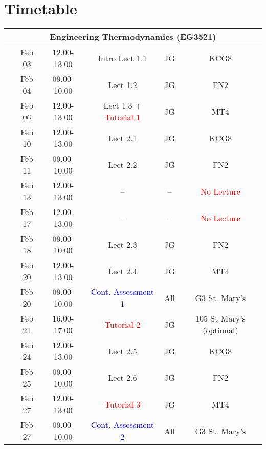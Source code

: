 \documentclass[11pt,oneside,a4paper]{article}
\begin{document}
\section{Timetable}


\begin{center}
\begin{tabular}{||c||c|c|c|c|c||}
\hline\hline
\multicolumn{6}{||c||}{Engineering Thermodynamics (EG3521)} \\
\hline\hline
\multirow{3}{*}{\color{red}{Week 30}} & Feb 03   & 12.00-13.00 & Intro Lect 1.1 & JG  & KCG8 \\
                                      & Feb 04   & 09.00-10.00 & Lect 1.2  & JG  & FN2  \\
                                      & Feb 06   & 12.00-13.00 & Lect 1.3 + \textcolor{red}{Tutorial 1} & JG  & MT4  \\
\hline
\multirow{3}{*}{\color{red}{Week 31}} & Feb 10   & 12.00-13.00 & Lect  2.1  & JG  & KCG8 \\
                                      & Feb 11   & 09.00-10.00 & Lect  2.2  & JG  & FN2 \\
                                      & Feb 13   & 12.00-13.00 &  --        & --    & \textcolor{red}{No Lecture} \\
\hline
\multirow{3}{*}{\color{red}{Week 32}} & Feb 17   & 12.00-13.00 & --         & --     & \textcolor{red}{No Lecture} \\
                                      & Feb 18   & 09.00-10.00 & Lect  2.3  & JG  & FN2  \\
                                      & Feb 20   & 12.00-13.00 & Lect  2.4  & JG  & MT4  \\
                                      & Feb 20   & 09.00-10.00 & \textcolor{blue}{Cont. Assessment 1} & All & G3 St. Mary's \\
                                      & Feb 21   & 16.00-17.00 & \textcolor{red}{Tutorial 2} & JG  & 105 St Mary's (optional)\\
\hline
\multirow{3}{*}{\color{red}{Week 33}} & Feb 24   & 12.00-13.00 & Lect  2.5  & JG  & KCG8 \\
                                      & Feb 25   & 09.00-10.00 & Lect  2.6  & JG  & FN2  \\
                                      & Feb 27   & 12.00-13.00 & \textcolor{red}{Tutorial 3} & JG  & MT4  \\
                                      & Feb 27   & 09.00-10.00 & \textcolor{blue}{Cont. Assessment 2} & All  &  G3 St. Mary's \\

\end{tabular}
\end{center}
\end{document}
